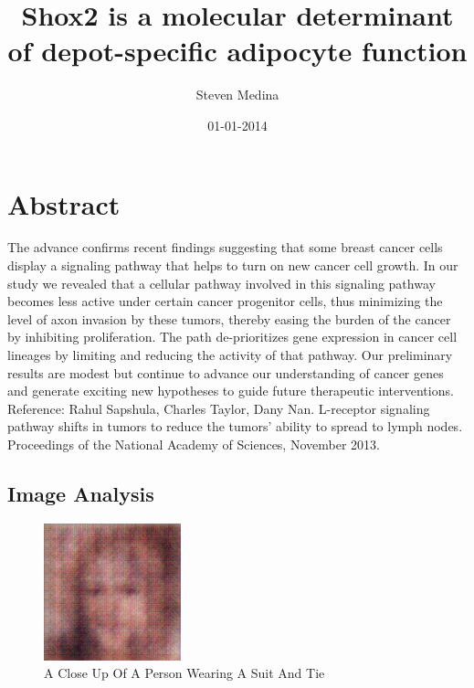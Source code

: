 \documentclass{article}%
\title{Shox2 is a molecular determinant of depot{-}specific adipocyte function}%
\author{Steven Medina}%
\affil{Department of Microbiology, Laboratory of Mycotoxins and Toxigenic Fungi, University of So Paulo, So Paulo, So Paulo, Brazil}%
\date{01{-}01{-}2014}%
\begin{document}
%
\normalsize%
\maketitle%
\section{Abstract}%
\label{sec:Abstract}%
The advance confirms recent findings suggesting that some breast cancer cells display a signaling pathway that helps to turn on new cancer cell growth. In our study we revealed that a cellular pathway involved in this signaling pathway becomes less active under certain cancer progenitor cells, thus minimizing the level of axon invasion by these tumors, thereby easing the burden of the cancer by inhibiting proliferation. The path de{-}prioritizes gene expression in cancer cell lineages by limiting and reducing the activity of that pathway. Our preliminary results are modest but continue to advance our understanding of cancer genes and generate exciting new hypotheses to guide future therapeutic interventions.\newline%
Reference: Rahul Sapshula, Charles Taylor, Dany Nan. L{-}receptor signaling pathway shifts in tumors to reduce the tumors' ability to spread to lymph nodes. Proceedings of the National Academy of Sciences, November 2013.

%
\subsection{Image Analysis}%
\label{subsec:ImageAnalysis}%


\begin{figure}[h!]%
\centering%
\includegraphics[width=150px]{500_fake_images/samples_5_113.png}%
\caption{A Close Up Of A Person Wearing A Suit And Tie}%
\end{figure}

%
\end{document}
